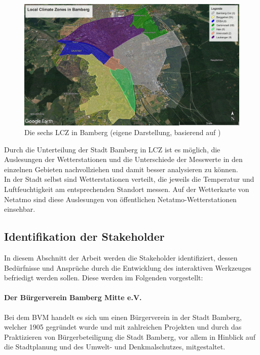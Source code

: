 \begin{figure}[t] %
    \centering
    \includegraphics[width=1\textwidth]{figures/lcz.jpg}
    \decoRule
    \caption[LCZ in Bamberg]{Die sechs \ac{LCZ} in Bamberg (eigene Darstellung, basierend auf \cite{stewart2012local,oke2004initial})}
    \label{fig:lcz}
\end{figure}

Durch die Unterteilung der Stadt Bamberg in \ac{LCZ} ist es möglich, die Auslesungen der Wetterstationen und die Unterschiede der Messwerte in den einzelnen Gebieten nachvollziehen und damit besser analysieren zu können. \\ In der Stadt selbst sind Wetterstationen verteilt, die jeweils die Temperatur und Luftfeuchtigkeit am entsprechenden Standort messen. Auf der Wetterkarte von Netatmo sind diese Auslesungen von öffentlichen Netatmo-Wetterstationen einsehbar.

\subsection{Identifikation der Stakeholder}
\label{sec:stakeholder}
In diesem Abschnitt der Arbeit werden die Stakeholder identifiziert, dessen Bedürfnisse und Ansprüche durch die Entwicklung des interaktiven Werkzeuges befriedigt werden sollen. Diese werden im Folgenden vorgestellt:

\paragraph{Der Bürgerverein Bamberg Mitte e.V.}
Bei dem \ac{BVM} handelt es sich um einen Bürgerverein in der Stadt Bamberg, welcher 1905 gegründet wurde und mit zahlreichen Projekten und durch das Praktizieren von Bürgerbeteiligung die Stadt Bamberg, vor allem in Hinblick auf die Stadtplanung und des Umwelt- und Denkmalschutzes, mitgestaltet.

